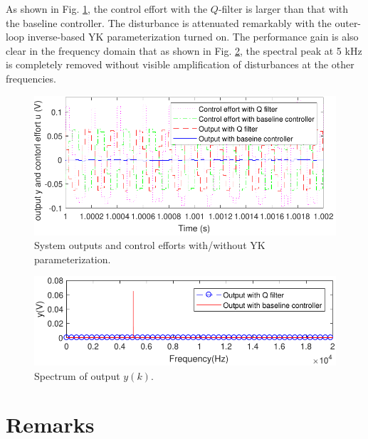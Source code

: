 \documentclass [11pt, proquest] {uwthesis}[2020/02/24]
\begin{document}
As shown in Fig. \ref{fig:System-output-with}, the control effort
with the $Q$-filter is larger than that with the baseline controller.
The disturbance is attenuated remarkably with the outer-loop inverse-based
YK parameterization turned on. The performance gain is also clear
in the frequency domain that as shown in Fig. \ref{fig:Spectrum-of-ooutput},
the spectral peak at 5 kHz is completely removed without visible amplification
of disturbances at the other frequencies.
\begin{figure}[!ht]
\begin{centering}
\includegraphics[width=13cm]{Loop-shaping/output_Q_baseline_2}
\par\end{centering}
\caption{\label{fig:System-output-with}System outputs and control efforts
with/without YK parameterization.}
\end{figure}
\begin{figure}[!ht]
\begin{centering}
\includegraphics[width=13cm]{Loop-shaping/spectrum}
\par\end{centering}
\caption{\label{fig:Spectrum-of-ooutput}Spectrum of output $y(k)$.}
\end{figure}

\section{Remarks}
\end{document}

